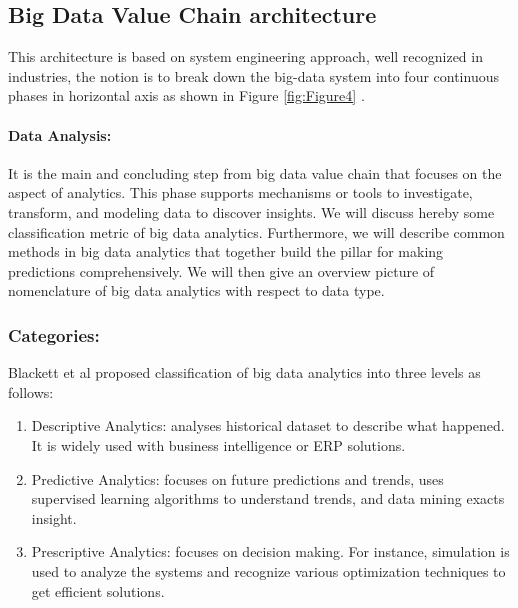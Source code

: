 \documentclass[runningheads]{llncs}
\begin{document}
\subsection{Big Data Value Chain architecture}
This architecture is based on system engineering approach, well recognized in industries, the notion is to break down the big-data system into four continuous phases in horizontal axis as shown in Figure \ref{fig:Figure4} \cite{5}.
\paragraph{Data Analysis:} It is the main and concluding step from big data value chain that focuses on the aspect of analytics. This phase supports mechanisms or tools to investigate, transform, and modeling data to discover insights. We will discuss hereby some classification metric of big data analytics. Furthermore, we will describe common methods in big data analytics that together build the pillar for making predictions comprehensively. We will then give an overview picture of nomenclature of big data analytics with respect to data type.
\subsubsection{Categories:}
Blackett et al \cite{10} proposed classification of big data analytics into three levels as follows:
\begin{enumerate}
	\item Descriptive Analytics: analyses historical dataset to describe what happened. It is widely used with business intelligence or ERP solutions.
	\item Predictive Analytics: focuses on future predictions and trends, uses supervised learning algorithms to understand trends, and data mining exacts insight.
	\item Prescriptive Analytics: focuses on decision making. For instance, simulation is used to analyze the systems and recognize various optimization techniques to get efficient solutions.
\end{enumerate} 
\end{document}
